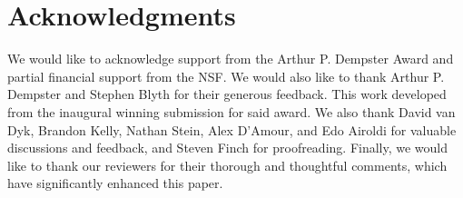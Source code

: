 \section*{Acknowledgments}
We would like to acknowledge support from the Arthur P. Dempster Award and partial financial support from the NSF.
We would also like to thank Arthur P. Dempster and Stephen Blyth for their generous feedback.
This work developed from the inaugural winning submission for said award.
We also thank David van Dyk, Brandon Kelly, Nathan Stein, Alex D'Amour, and Edo Airoldi for valuable discussions and feedback, and Steven Finch for proofreading.
Finally, we would like to thank our reviewers for their thorough and thoughtful comments, which have significantly enhanced this paper.